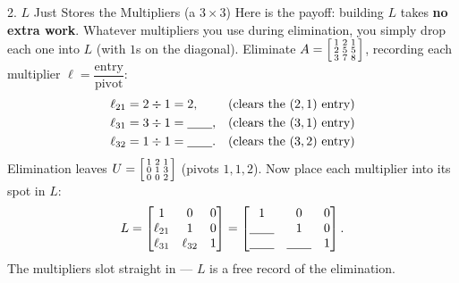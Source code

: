 \documentclass[10pt]{article}
\begin{document}
\begin{notesbox}{2. $L$ Just Stores the Multipliers (a $3\times3$)}
Here is the payoff: building $L$ takes \textbf{no extra work}. Whatever multipliers you use during
elimination, you simply drop each one into $L$ (with $1$s on the diagonal). Eliminate
$A=\begin{bsmallmatrix} 1&2&1\\2&5&5\\3&7&8 \end{bsmallmatrix}$, recording each multiplier
$\ell=\dfrac{\text{entry}}{\text{pivot}}$:
\[
  \begin{array}{ll}
    \ell_{21} = 2 \div 1 = 2, & \text{(clears the $(2,1)$ entry)}\\[3pt]
    \ell_{31} = 3 \div 1 = \blank{0.7cm}, & \text{(clears the $(3,1)$ entry)}\\[3pt]
    \ell_{32} = 1 \div 1 = \blank{0.7cm}. & \text{(clears the $(3,2)$ entry)}
  \end{array}
\]
Elimination leaves $U=\begin{bsmallmatrix} 1&2&1\\0&1&3\\0&0&2 \end{bsmallmatrix}$ (pivots $1,1,2$). Now
place each multiplier into its spot in $L$:
\[
  L = \begin{bmatrix} 1 & 0 & 0 \\ \ell_{21} & 1 & 0 \\ \ell_{31} & \ell_{32} & 1 \end{bmatrix}
    = \begin{bmatrix} 1 & 0 & 0 \\ \blank{0.7cm} & 1 & 0 \\ \blank{0.7cm} & \blank{0.7cm} & 1 \end{bmatrix}.
\]
The multipliers slot straight in --- $L$ is a free record of the elimination.
\end{notesbox}
\end{document}
